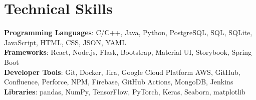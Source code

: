 \documentclass[letterpaper,11pt]{article}
\newcommand{\resumeItem}[1]{
  \item\small{
    {#1 \vspace{-2pt}}
  }
}
\newcommand{\resumeItemListStart}{\begin{itemize}}
\newcommand{\resumeItemListEnd}{\end{itemize}\vspace{-5pt}}
\begin{document}
\section{\textbf{Technical Skills}}
 \begin{itemize}[leftmargin=0.15in, label={}]
    \small{\item{
     \textbf{Programming Languages}{: C/C++, Java, Python, PostgreSQL, SQL, SQLite, JavaScript, HTML, CSS, JSON, YAML} \\
     \textbf{Frameworks}{: React, Node.js, Flask, Bootstrap, Material-UI, Storybook, Spring Boot} \\
     \textbf{Developer Tools}{: Git, Docker, Jira, Google Cloud Platform AWS, GitHub, Confluence, Perforce, NPM, Firebase, GitHub Actions, MongoDB, Jenkins} \\
     \textbf{Libraries}{: pandas, NumPy, TensorFlow, PyTorch, Keras, Seaborn, matplotlib } \\
    }}
 \end{itemize}


\end{document}
